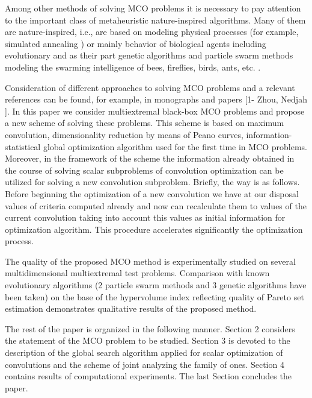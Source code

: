 \documentclass[]{interact}
\theoremstyle{plain}%
\theoremstyle{definition}
\theoremstyle{remark}
\begin{document}
Among other methods of solving MCO problems it is necessary to pay attention to the important class of metaheuristic nature-inspired algorithms. Many of them are nature-inspired, i.e.,  are  based on modeling physical processes (for example, simulated annealing \cite{Locatelli2002,Aarts2014}) or mainly behavior of biological agents including evolutionary \cite{Price2005,Coello2007} and as their part genetic algorithms \cite{Ruiz2015,Deb2002,Zitzler2001} and particle swarm methods modeling the swarming intelligence of bees, fireflies, birds, ants, etc. \cite{Mostaghim2007,Nebro2009,Durillo2010}.

Consideration of different approaches to solving MCO problems and a relevant references can be found, for example, in monographs and papers \cite{Zhou2011,Nedjah2015} \colorbox[rgb]{1,1,0}{[1-  Zhou, Nedjah ]}.
In this paper we consider multiextremal black-box MCO problems and propose a new scheme of solving these problems. This scheme is based on maximum convolution, dimensionality reduction by means of Peano curves, information-statistical global optimization algorithm used for the first time in MCO problems. Moreover, in the framework of the scheme the information already obtained in the course of solving scalar subproblems of convolution optimization can be utilized for solving a new convolution subproblem. Briefly, the way is as follows. Before beginning the optimization of a new convolution we have at our disposal values of criteria computed already and now can recalculate them to values of the current convolution taking into account this values as initial information for optimization algorithm. This procedure accelerates significantly the optimization process.

The quality of the proposed MCO method is experimentally studied on several multidimensional multiextremal test problems. Comparison with known evolutionary algorithms (2 particle swarm methods and 3 genetic algorithms have been taken) on the base of the hypervolume index \cite{Evtushenko2014,Zilinskas2015} reflecting quality of Pareto set estimation demonstrates qualitative results of the proposed method.

The rest of the paper is organized in the following manner. Section 2 considers the statement of the MCO problem to be studied. Section 3 is devoted to the description of the global search algorithm applied for scalar optimization of convolutions and the scheme of joint analyzing the family of ones. Section 4 contains results of computational experiments. The last Section concludes the paper.
\end{document}
